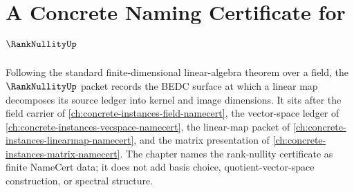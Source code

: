 \chapter{A Concrete Naming Certificate for $\RankNullityUp$}
\label{ch:concrete-instances-rank-nullity-namecert}

Following the standard finite-dimensional linear-algebra theorem over a field, the $\RankNullityUp$ packet records the BEDC surface at which a linear map decomposes its source ledger into kernel and image dimensions. It sits after the field carrier of \autoref{ch:concrete-instances-field-namecert}, the vector-space ledger of \autoref{ch:concrete-instances-vecspace-namecert}, the linear-map packet of \autoref{ch:concrete-instances-linearmap-namecert}, and the matrix presentation of \autoref{ch:concrete-instances-matrix-namecert}. The chapter names the rank-nullity certificate as finite NameCert data; it does not add basis choice, quotient-vector-space construction, or spectral structure.

